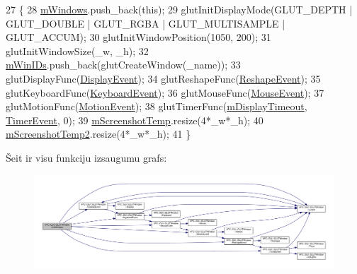 \begin{DoxyCode}
27 \{
28     \hyperlink{class_v_p_c_1_1_g_u_i_1_1_g_l_u_t_window_aad2948c3a88afb3bc03f9bc54a81f285}{mWindows}.push\_back(\textcolor{keyword}{this});
29     glutInitDisplayMode(GLUT\_DEPTH | GLUT\_DOUBLE | GLUT\_RGBA | GLUT\_MULTISAMPLE | GLUT\_ACCUM);
30     glutInitWindowPosition(1050, 200);
31     glutInitWindowSize(\_w, \_h);
32     \hyperlink{class_v_p_c_1_1_g_u_i_1_1_g_l_u_t_window_a1ceb7745b98f3497579a0f4e8288419e}{mWinIDs}.push\_back(glutCreateWindow(\_name));
33     glutDisplayFunc(\hyperlink{class_v_p_c_1_1_g_u_i_1_1_g_l_u_t_window_a8874ae9e61f82863cec3b3524c3b0d33}{DisplayEvent});
34     glutReshapeFunc(\hyperlink{class_v_p_c_1_1_g_u_i_1_1_g_l_u_t_window_a584bc6119237804393bc403de78031a3}{ReshapeEvent});
35     glutKeyboardFunc(\hyperlink{class_v_p_c_1_1_g_u_i_1_1_g_l_u_t_window_ad94b80f2d5d0d032aac9ee71b6fdcf9b}{KeyboardEvent});
36     glutMouseFunc(\hyperlink{class_v_p_c_1_1_g_u_i_1_1_g_l_u_t_window_ae838963ea1a595625bddfa31dd9cbabd}{MouseEvent});
37     glutMotionFunc(\hyperlink{class_v_p_c_1_1_g_u_i_1_1_g_l_u_t_window_a962cbc03bcbb5a0541978ec3630f65a6}{MotionEvent});
38     glutTimerFunc(\hyperlink{class_v_p_c_1_1_g_u_i_1_1_g_l_u_t_window_a1a0397ed6b305040c02660e4154d3282}{mDisplayTimeout}, \hyperlink{class_v_p_c_1_1_g_u_i_1_1_g_l_u_t_window_a3dd7ed12ee68dea02946415292139a0e}{TimerEvent}, 0);
39     \hyperlink{class_v_p_c_1_1_g_u_i_1_1_g_l_u_t_window_a3fb2ef7f66b526626c242cf35a4af080}{mScreenshotTemp}.resize(4*\_w*\_h);
40     \hyperlink{class_v_p_c_1_1_g_u_i_1_1_g_l_u_t_window_a9a373bab4c85c9a39d5b188311509ea6}{mScreenshotTemp2}.resize(4*\_w*\_h);
41 \}
\end{DoxyCode}


Šeit ir visu funkciju izsaugumu grafs\+:
\nopagebreak
\begin{figure}[H]
\begin{center}
\leavevmode
\includegraphics[width=350pt]{class_v_p_c_1_1_g_u_i_1_1_g_l_u_t_window_a2e763564b7728a1b8faf65694f148d79_cgraph}
\end{center}
\end{figure}




